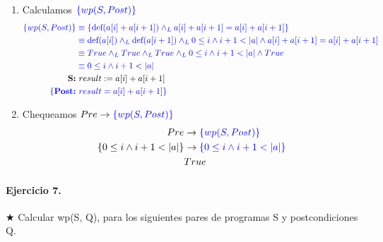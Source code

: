 \documentclass{article}
\begin{document}
\begin{enumerate}[label=\alph*)]
\begin{enumerate}[label=\arabic*.]
	\item Calculamos $\color{blue}\{wp(S,Post)\}$
		\begin{align*}
		\color{blue}\{wp(S,Post)\}
			&\color{blue} \equiv \{\textrm{def}(a[i] + a[i + 1])
				\wedge_L a[i] + a[i + 1]=a[i] + a[i + 1] \}\\
			&\color{blue} \equiv \textrm{def}(a[i]) \wedge_L
				 \textrm{def}(a[i + 1]) \wedge_L 0\leq i \wedge i+1<|a|
				  \wedge a[i] + a[i + 1]=a[i] + a[i + 1]\\
			&\color{blue} \equiv True \wedge_L
				 True \wedge_L True \wedge_L 0\leq i \wedge i+1<|a|
				  \wedge True\\
			&\color{blue} \equiv 0\leq i \wedge i+1<|a| \\	  
		\textbf{S:} &\  result := a[i] + a[i + 1]\\
		\color{blue}\{\textbf{Post:} &\color{blue}\  result = a[i] + a[i + 1]\}\\
		\end{align*}
	\item Chequeamos $Pre \rightarrow \color{blue}\{wp(S,Post)\}$		
		\begin{align*}
		Pre &\rightarrow \color{blue}\{wp(S,Post)\}\\
		\{0 \leq i \wedge i + 1 < |a|\}&\rightarrow \color{blue}\{0\leq i \wedge i+1<|a|\}\\
		& True 
		\end{align*}
	\end{enumerate}
\end{enumerate}
                                                            
\paragraph{Ejercicio 7.} $\bigstar$ Calcular wp(S, Q), para los siguientes pares de programas S y postcondiciones Q.
\end{document}
